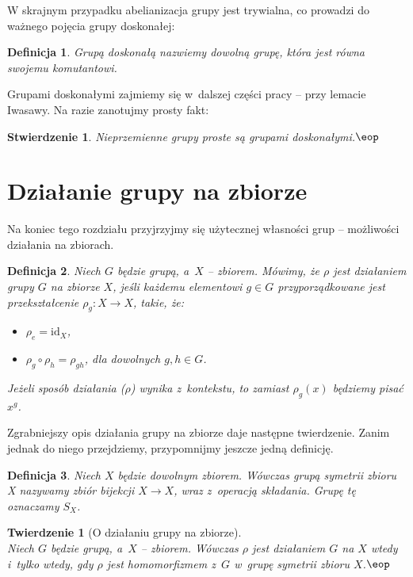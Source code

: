 \documentclass[licencjacka]{pracamgr}
\newtheorem{deff}{Definicja}[section]
\newtheorem{thh}{Twierdzenie}[section]
\newtheorem{fact}{Stwierdzenie}[section]
\begin{document}
W skrajnym przypadku abelianizacja grupy jest trywialna, co prowadzi do ważnego pojęcia
grupy doskonałej:

\begin{deff}
    \emph{Grupą doskonałą} nazwiemy dowolną grupę, która jest równa swojemu komutantowi.
\end{deff}

Grupami doskonałymi zajmiemy się w~dalszej części pracy -- przy
lemacie Iwasawy. Na razie zanotujmy prosty fakt:

\begin{fact}
    Nieprzemienne grupy proste są grupami doskonałymi.\quad$\eop$
\end{fact}


\section{Działanie grupy na zbiorze}
Na koniec tego rozdziału przyjrzyjmy się użytecznej
własności grup -- możliwości działania na zbiorach.

\begin{deff}
    Niech $G$ będzie grupą, a~$X$ -- zbiorem. Mówimy, że \emph{$\rho$ jest działaniem grupy $G$ na zbiorze $X$},
    jeśli każdemu elementowi $g \in G$ przyporządkowane jest przekształcenie $\rho_g\colon X \to X$, takie, że:
    \begin{itemize}
        \item $\rho_e = \mathrm{id}_X$,
        \item $\rho_g \circ \rho_h = \rho_{gh}$, dla dowolnych $g, h \in G$.
    \end{itemize}
    Jeżeli sposób działania ($\rho$) wynika z~kontekstu, to zamiast $\rho_g(x)$ będziemy pisać $x^g$.
\end{deff}

Zgrabniejszy opis działania grupy na zbiorze daje następne
twierdzenie. Zanim jednak do niego przejdziemy, przypomnijmy
jeszcze jedną definicję.

\begin{deff}
    Niech $X$ będzie dowolnym zbiorem. Wówczas \emph{grupą symetrii zbioru X} nazywamy zbiór bijekcji $X \to X$,
    wraz z~operacją składania. Grupę tę oznaczamy $S_X$.
\end{deff}

\begin{thh}[O działaniu grupy na zbiorze] $ $ \\
    Niech $G$ będzie grupą, a~$X$ -- zbiorem. Wówczas $\rho$ jest działaniem $G$ na $X$ wtedy i~tylko wtedy,
    gdy $\rho$ jest homomorfizmem z~$G$ w~grupę symetrii zbioru $X$.\quad$\eop$
\end{thh}
\end{document}
